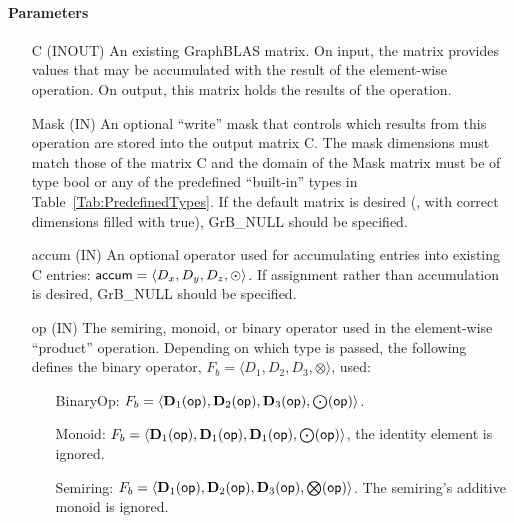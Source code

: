 \paragraph{Parameters}

\begin{itemize}[leftmargin=1.1in]
    \item[{\sf C}]    ({\sf INOUT}) An existing GraphBLAS matrix.  On input,
    the matrix provides values that may be accumulated with the result of the
    element-wise operation.  On output, this matrix holds the results of the
    operation.
    
    \item[{\sf Mask}] ({\sf IN}) An optional ``write'' mask that controls which
    results from this operation are stored into the output matrix {\sf C}. The 
    mask dimensions must match those of the matrix {\sf C} and the domain of the 
    {\sf Mask} matrix must be of type {\sf bool} or any of the predefined 
    ``built-in'' types in Table~\ref{Tab:PredefinedTypes}.  If the default
    matrix is desired (\ie, with correct dimensions filled with {\sf true}), 
    {\sf GrB\_NULL} should be specified.

    \item[{\sf accum}] ({\sf IN}) An optional operator used for accumulating
    entries into existing {\sf C} entries: ${\sf accum} = \langle D_x,
    D_y, D_z,\odot \rangle$. If assignment rather than accumulation is
    desired, {\sf GrB\_NULL} should be specified.

    \item[{\sf op}]    ({\sf IN}) The semiring, monoid, or binary operator 
    used in the element-wise ``product'' operation.  Depending on which type is
    passed, the following defines the binary operator, $F_b=\langle D_1,D_2,D_3,\otimes\rangle$, used:
    \begin{itemize}[leftmargin=1.1in]
    \item[BinaryOp:] $F_b = \langle \bold{D}_1({\sf op}), \bold{D}_2({\sf op}),
    \bold{D}_3({\sf op}),\bold{\bigodot}({\sf op})\rangle$.  
    \item[Monoid:] $F_b = \langle \bold{D}_1({\sf op}), \bold{D}_1({\sf op}),
    \bold{D}_1({\sf op}),\bold{\bigodot}({\sf op})\rangle$,
    the identity element is ignored. 
    \item[Semiring:] $F_b = \langle \bold{D}_1({\sf op}), \bold{D}_2({\sf op}),
    \bold{D}_3({\sf op}),\bold{\bigotimes}({\sf op})\rangle$.  The semiring's
    additive monoid is ignored.
    \end{itemize}
    

\end{itemize}
